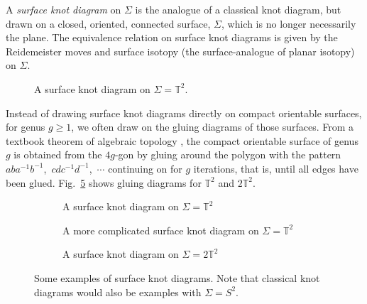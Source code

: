 \documentclass[12pt]{report}
\newcommand{\T}{\mathbb{T}}
\theoremstyle{upright}
\begin{document}
A \textit{surface knot diagram} on $\Sigma$ is the analogue of a classical knot diagram, but drawn on a closed, oriented, connected surface, $\Sigma$, which is no longer necessarily the plane. The equivalence relation on surface knot diagrams is given by the Reidemeister moves and surface isotopy (the surface-analogue of planar isotopy) on $\Sigma$.

\begin{figure}[hbt!]
	\centering
	\def\svgscale{0.6}
	
	
	\caption{A surface knot diagram on $\Sigma = \T^{2}$.}
	\label{fig:surface-knot-diagram-example}
\end{figure}

Instead of drawing surface knot diagrams directly on compact orientable surfaces, for genus $g \geq 1$, we often draw on the gluing diagrams of those surfaces. From a textbook theorem of algebraic topology \parencite[Chapter 0]{algebraic-topology}, the compact orientable surface of genus $g$ is obtained from the $4g$-gon by gluing around the polygon with the pattern $aba^{-1}b^{-1}$,~$cdc^{-1}d^{-1}$,~$\cdots$ continuing on for $g$ iterations, that is, until all edges have been glued. Fig.~\ref{fig:surface-knot-diagram-examples} shows gluing diagrams for $\T^{2}$ and $2\T^{2}$.
\begin{figure}[hbt!]
	\centering
	\hspace*{\fill}
	\begin{subfigure}[b]{0.3 \textwidth}
		\centering
		\def\svgscale{0.26}
		
		\caption{A surface knot diagram on $\Sigma = \T^{2}$}
		\label{fig:torus-unknot}
	\end{subfigure}
	\hspace*{\fill}
	\begin{subfigure}[b]{0.3 \textwidth}
		\centering
		\def\svgscale{0.26}
		
		\caption{A more complicated surface knot diagram on $\Sigma = \T^{2}$}
		\label{fig:torus-vknot}
	\end{subfigure}
	\hspace*{\fill}
	\begin{subfigure}[b]{0.3 \textwidth}
		\centering
		\def\svgscale{0.24}
		
		\caption{A surface knot diagram on $\Sigma = 2\T^{2}$}
		\label{fig:2torus-vknot}
	\end{subfigure}
	\caption{Some examples of surface knot diagrams. Note that classical knot diagrams would also be examples with $\Sigma = S^{2}$.}
	\label{fig:surface-knot-diagram-examples}
	\hspace*{\fill} 
\end{figure}
\end{document}
